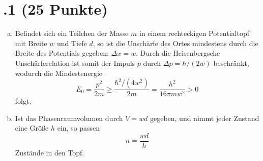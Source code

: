 \section*{\nr.1 \titone (25 Punkte)}
\begin{enumerate}[(a)]
\item Befindet sich ein Teilchen der Masse $m$ in einem rechteckigen Potentialtopf mit Breite $w$ und Tiefe $d$, so ist die Unschärfe des Ortes mindestens durch die Breite des Potentials gegeben: $\Delta x = w$. Durch die Heisenbergsche Unschärferelation ist somit der Impuls $p$ durch $\Delta p = \hbar/(2w)$ beschränkt, wodurch die Mindestenergie
\begin{equation}
E_0 = \frac{p^2}{2m} \geq \frac{\hbar^2/(4w^2)}{2m} = \frac{h^2}{16\pi m w^2} > 0
\end{equation}
folgt.
\item Ist das Phasenraumvolumen durch $V = wd$ gegeben, und nimmt jeder Zustand eine Größe $h$ ein, so passen
\begin{equation}
n = \frac{wd}{h}
\end{equation}
Zustände in den Topf.
\end{enumerate}